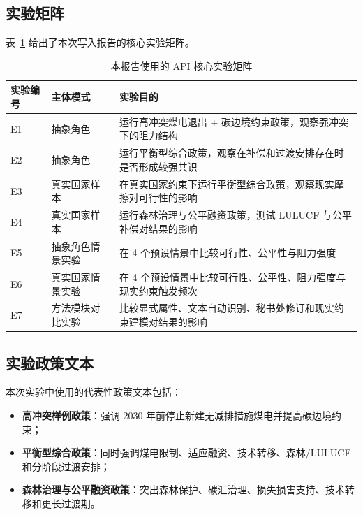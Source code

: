\documentclass[12pt,a4paper]{ctexart}
\begin{document}
\subsection{实验矩阵}
表~\ref{tab:exp-matrix} 给出了本次写入报告的核心实验矩阵。

\begin{table}[H]
\centering
\caption{本报告使用的 API 核心实验矩阵}
\label{tab:exp-matrix}
\begin{tabularx}{\textwidth}{>{\raggedright\arraybackslash}p{3cm} >{\raggedright\arraybackslash}p{2.2cm} >{\raggedright\arraybackslash}X}
\toprule
实验编号 & 主体模式 & 实验目的 \\
\midrule
E1 & 抽象角色 & 运行高冲突煤电退出 + 碳边境约束政策，观察强冲突下的阻力结构 \\
E2 & 抽象角色 & 运行平衡型综合政策，观察在补偿和过渡安排存在时是否形成较强共识 \\
E3 & 真实国家样本 & 在真实国家约束下运行平衡型综合政策，观察现实摩擦对可行性的影响 \\
E4 & 真实国家样本 & 运行森林治理与公平融资政策，测试 LULUCF 与公平补偿对结果的影响 \\
E5 & 抽象角色情景实验 & 在 4 个预设情景中比较可行性、公平性与阻力强度 \\
E6 & 真实国家情景实验 & 在 4 个预设情景中比较可行性、公平性、阻力强度与现实约束触发频次 \\
E7 & 方法模块对比实验 & 比较显式属性、文本自动识别、秘书处修订和现实约束建模对结果的影响 \\
\bottomrule
\end{tabularx}
\end{table}

\subsection{实验政策文本}
本次实验中使用的代表性政策文本包括：
\begin{itemize}
  \item \textbf{高冲突样例政策}：强调 2030 年前停止新建无减排措施煤电并提高碳边境约束；
  \item \textbf{平衡型综合政策}：同时强调煤电限制、适应融资、技术转移、森林/LULUCF 和分阶段过渡安排；
  \item \textbf{森林治理与公平融资政策}：突出森林保护、碳汇治理、损失损害支持、技术转移和更长过渡期。
\end{itemize}
\end{document}
